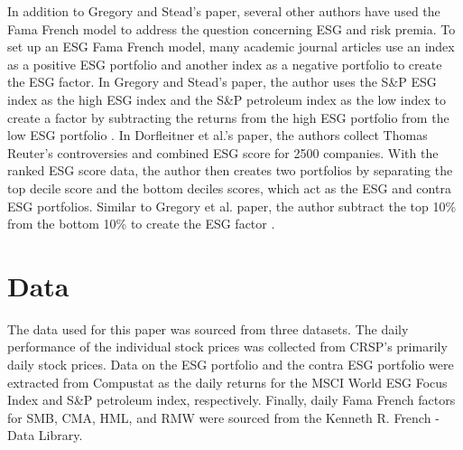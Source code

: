 \documentclass[12pt,oneside,reqno]{amsart}
\begin{document}
In addition to Gregory and Stead's paper, several other authors have used the Fama French model to address the question concerning ESG and risk premia. To set up an ESG Fama French model, many academic journal articles use an index as a positive ESG portfolio and another index as a negative portfolio to create the ESG factor. In Gregory and Stead's paper, the author uses the S\&P ESG index as the high ESG index and the S\&P petroleum index as the low index to create a factor by subtracting the returns from the high ESG portfolio from the low ESG portfolio \cite{Gregory2020TheGP}. In Dorfleitner et al.'s paper, the authors collect Thomas Reuter's controversies and combined ESG score for 2500 companies. With the ranked ESG score data, the author then creates two portfolios by separating the top decile score and the bottom deciles scores, which act as the ESG and contra ESG portfolios. Similar to Gregory et al. paper, the author subtract the top 10\% from the bottom 10\% to create the ESG factor \cite{Dorfleitner2020ESGCA}.   


\section{Data}
\label{Data}
The data used for this paper was sourced from three datasets. The daily performance of the individual stock prices was collected from CRSP's primarily daily stock prices. Data on the ESG portfolio and the contra ESG portfolio were extracted from Compustat as the daily returns for the MSCI World ESG Focus Index and S\&P petroleum index, respectively. Finally, daily Fama French factors for SMB, CMA, HML, and RMW were sourced from the Kenneth R. French - Data Library.  
\end{document}
